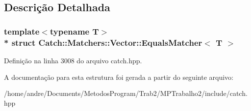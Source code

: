 \subsection{Descrição Detalhada}
\subsubsection*{template$<$typename T$>$\\*
struct Catch\+::\+Matchers\+::\+Vector\+::\+Equals\+Matcher$<$ T $>$}



Definição na linha 3008 do arquivo catch.\+hpp.



A documentação para esta estrutura foi gerada a partir do seguinte arquivo\+:\begin{DoxyCompactItemize}
\item 
/home/andre/\+Documents/\+Metodos\+Program/\+Trab2/\+M\+P\+Trabalho2/include/catch.\+hpp\end{DoxyCompactItemize}

